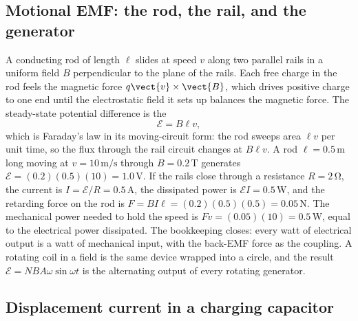 \subsection{Motional EMF: the rod, the rail, and the generator}

A conducting rod of length $\ell$ slides at speed $v$ along two parallel
rails in a uniform field $B$ perpendicular to the plane of the rails.
Each free charge in the rod feels the magnetic force $q\vect{v}\times
\vect{B}$, which drives positive charge to one end until the
electrostatic field it sets up balances the magnetic force. The
steady-state potential difference is the 
\[
\mathcal{E} = B\ell v,
\]
which is Faraday's law in its moving-circuit form: the rod sweeps area
$\ell v$ per unit time, so the flux through the rail circuit changes at
$B\ell v$. A rod $\ell = 0.5\,\si{\meter}$ long moving at $v = 10\,\si{
\meter\per\second}$ through $B = 0.2\,\si{\tesla}$ generates
$\mathcal{E} = (0.2)(0.5)(10) = 1.0\,\si{\volt}$. If the rails close
through a resistance $R = 2\,\si{\ohm}$, the current is $I = \mathcal{E}
/R = 0.5\,\si{\ampere}$, the dissipated power is $\mathcal{E}I =
0.5\,\si{\watt}$, and the retarding force on the rod is $F = BI\ell =
(0.2)(0.5)(0.5) = 0.05\,\si{\newton}$. The mechanical power needed to
hold the speed is $Fv = (0.05)(10) = 0.5\,\si{\watt}$, equal to the
electrical power dissipated. The bookkeeping closes: every watt of
electrical output is a watt of mechanical input, with the back-EMF
force as the coupling. A rotating coil in a field is the same device
wrapped into a circle, and the result $\mathcal{E} = N B A \omega
\sin\omega t$ is the alternating output of every rotating generator.

\subsection{Displacement current in a charging capacitor}

